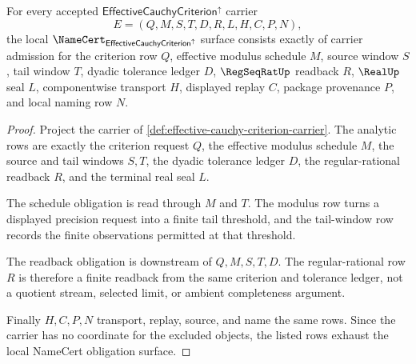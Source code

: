 \begin{theorem}
\label{thm:effective-cauchy-criterion-namecert-obligations}
For every accepted $\mathsf{EffectiveCauchyCriterion}^{\uparrow}$ carrier
$$
E=(Q,M,S,T,D,R,L,H,C,P,N),
$$
the local $\NameCert_{\mathsf{EffectiveCauchyCriterion}^{\uparrow}}$ surface consists exactly of carrier admission for the criterion row $Q$, effective modulus schedule $M$, source window $S$, tail window $T$, dyadic tolerance ledger $D$, $\RegSeqRatUp$ readback $R$, $\RealUp$ seal $L$, componentwise transport $H$, displayed replay $C$, package provenance $P$, and local naming row $N$.
\end{theorem}
\begin{proof}
Project the carrier of \autoref{def:effective-cauchy-criterion-carrier}. The analytic rows are exactly the criterion request $Q$, the effective modulus schedule $M$, the source and tail windows $S,T$, the dyadic tolerance ledger $D$, the regular-rational readback $R$, and the terminal real seal $L$.

The schedule obligation is read through $M$ and $T$. The modulus row turns a displayed precision request into a finite tail threshold, and the tail-window row records the finite observations permitted at that threshold.

The readback obligation is downstream of $Q,M,S,T,D$. The regular-rational row $R$ is therefore a finite readback from the same criterion and tolerance ledger, not a quotient stream, selected limit, or ambient completeness argument.

Finally $H,C,P,N$ transport, replay, source, and name the same rows. Since the carrier has no coordinate for the excluded objects, the listed rows exhaust the local NameCert obligation surface.
\end{proof}

